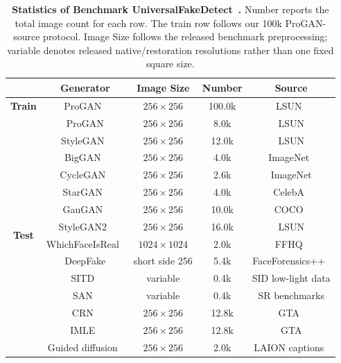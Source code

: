 \documentclass[lettersize,journal]{IEEEtran}
\begin{document}
\begin{table}[H]
\caption{\textbf{Statistics of Benchmark UniversalFakeDetect~\cite{ojha2023univfd,wang2020cnnspot}.} Number reports the total image count for each row. The train row follows our 100k ProGAN-source protocol. Image Size follows the released benchmark preprocessing; variable denotes released native/restoration resolutions rather than one fixed square size.}
\label{tab:appendix_ufd_statistics}
\centering
\small
\renewcommand{\arraystretch}{1.02}
\setlength{\tabcolsep}{7pt}
\begin{tabular}{@{}c|cccc@{}}
\toprule
& \textbf{Generator} & \textbf{Image Size} & \textbf{Number} & \textbf{Source} \\
\midrule
\textbf{Train} & ProGAN~\cite{karras2018progan} & $256\times256$ & 100.0k & LSUN~\cite{yu2015lsun} \\
\midrule
\multirow{21}{*}{\textbf{Test}}
& ProGAN & $256\times256$ & 8.0k & LSUN \\
& StyleGAN~\cite{karras2019stylegan} & $256\times256$ & 12.0k & LSUN \\
& BigGAN~\cite{brock2019biggan} & $256\times256$ & 4.0k & ImageNet~\cite{deng2009imagenet} \\
& CycleGAN~\cite{zhu2017cyclegan} & $256\times256$ & 2.6k & ImageNet \\
& StarGAN~\cite{choi2018stargan} & $256\times256$ & 4.0k & CelebA~\cite{liu2015celeba} \\
& GauGAN~\cite{park2019spade} & $256\times256$ & 10.0k & COCO~\cite{lin2014coco} \\
& StyleGAN2~\cite{karras2020stylegan2} & $256\times256$ & 16.0k & LSUN \\
& WhichFaceIsReal~\cite{whichfaceisreal2023} & $1024\times1024$ & 2.0k & FFHQ~\cite{karras2019stylegan} \\
& DeepFake & short side 256 & 5.4k & FaceForensics++~\cite{rossler2019faceforensics} \\
& SITD~\cite{chen2018sid} & variable & 0.4k & SID low-light data \\
& SAN~\cite{dai2019san} & variable & 0.4k & SR benchmarks \\
& CRN~\cite{chen2017crn} & $256\times256$ & 12.8k & GTA~\cite{richter2016playing} \\
& IMLE~\cite{li2019imle} & $256\times256$ & 12.8k & GTA \\
& Guided diffusion~\cite{dhariwal2021diffusion} & $256\times256$ & 2.0k & LAION captions~\cite{schuhmann2021laion400m} \\

\end{tabular}
\end{table}
\end{document}
